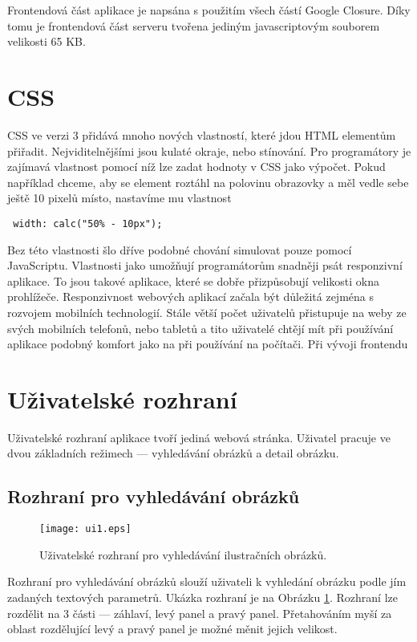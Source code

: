 Frontendová část aplikace je napsána s použitím všech částí Google Closure. Díky tomu je frontendová část serveru tvořena jediným javascriptovým souborem velikosti 65 KB.

\section{CSS}

CSS ve verzi 3 přidává mnoho nových vlastností, které jdou HTML elementům přiřadit. Nejviditelnějšími jsou kulaté okraje, nebo stínování. Pro programátory je zajímavá vlastnost  pomocí níž lze zadat hodnoty v CSS jako výpočet. Pokud například chceme, aby se element roztáhl na polovinu obrazovky a měl vedle sebe ještě 10 pixelů místo, nastavíme mu vlastnost

\begin{lstlisting}
 width: calc("50% - 10px");
\end{lstlisting}

Bez této vlastnosti šlo dříve podobné chování simulovat pouze pomocí JavaScriptu. Vlastnosti jako  umožňují programátorům snadněji psát responzivní aplikace. To jsou takové aplikace, které se dobře přizpůsobují velikosti okna prohlížeče. Responzivnost webových aplikací začala být důležitá zejména s rozvojem mobilních technologií. Stále větší počet uživatelů přistupuje na weby ze svých mobilních telefonů, nebo tabletů a tito uživatelé chtějí mít při používání aplikace podobný komfort jako na při používání na počítači. Při vývoji frontendu 

\section{Uživatelské rozhraní}

Uživatelské rozhraní aplikace tvoří jediná webová stránka. Uživatel pracuje ve dvou základních režimech --- vyhledávání obrázků a detail obrázku.

\subsection{Rozhraní pro vyhledávání obrázků}

\begin{figure}[h]
  \centering
  \texttt{[image: ui1.eps]}
  \caption{Uživatelské rozhraní pro vyhledávání ilustračních obrázků.}
  \label{fig:ui1}
\end{figure}

Rozhraní pro vyhledávání obrázků slouží uživateli k vyhledání obrázku podle jím zadaných textových parametrů. Ukázka rozhraní je na Obrázku \ref{fig:ui1}. Rozhraní lze rozdělit na 3 části --- záhlaví, levý panel a pravý panel. Přetahováním myší za oblast rozdělující levý a pravý panel je možné měnit jejich velikost.

